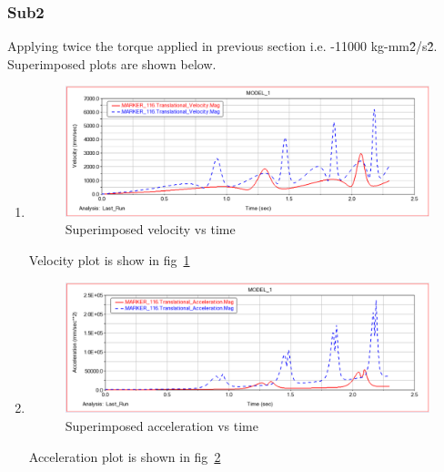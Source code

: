         \subsubsection{Sub2}
            Applying twice the torque applied in previous section i.e. -11000 kg-mm\^2/s\^2. Superimposed plots are shown below.
            \begin{enumerate}
                \item 
                    \begin{figure}[hbt!]
                        \centering
                        \includegraphics[width=0.9\columnwidth]{Images/Velocity_312.png}
                        \caption{Superimposed velocity vs time}
                        \label{fig:vel_2}
                    \end{figure}
                    Velocity plot is show in fig~\ref{fig:vel_2}
                \item 
                    \begin{figure}[hbt!]
                        \centering
                        \includegraphics[width=0.9\columnwidth]{Images/Acceleration_312.png}
                        \caption{Superimposed acceleration vs time}
                        \label{fig:acc_2}
                    \end{figure}
                    Acceleration plot is shown in fig~\ref{fig:acc_2}
            \end{enumerate}
            

